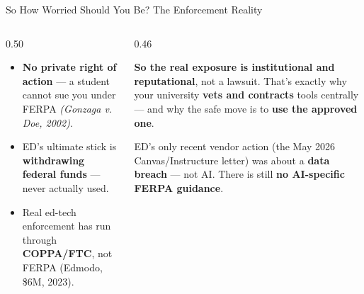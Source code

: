 \documentclass[aspectratio=169, 10pt]{beamer}
\newcommand{\cmcite}[1]{{\scriptsize\color{CoolGray}\textit{#1}}}
\begin{document}
\begin{frame}{So How Worried Should You Be? The Enforcement Reality}
\begin{columns}[T]
\begin{column}{0.50\textwidth}
\begin{tcolorbox}[keybox, title={\faBalanceScale\quad How FERPA is enforced}, top=3pt, bottom=3pt]
\small
\begin{itemize}\setlength{\itemsep}{2pt}
  \item \textbf{No private right of action} --- a student cannot sue you under FERPA \cmcite{(\textit{Gonzaga v. Doe}, 2002)}.
  \item ED's ultimate stick is \textbf{withdrawing federal funds} --- never actually used.
  \item Real ed-tech enforcement has run through \textbf{COPPA/FTC}, not FERPA (Edmodo, \$6M, 2023).
\end{itemize}
\end{tcolorbox}
\end{column}
\begin{column}{0.46\textwidth}
\begin{tcolorbox}[accentbox]
\small
\textbf{So the real exposure is \textbf{institutional and reputational}}, not a lawsuit.
\vskip3pt
That's exactly why your university \textbf{vets and contracts} tools centrally --- and why the safe move is to \textbf{use the approved one}.
\end{tcolorbox}
\vskip3pt
\begin{tcolorbox}[quotebox, top=2pt, bottom=2pt]
\scriptsize ED's only recent vendor action (the May 2026 Canvas/Instructure letter) was about a \textbf{data breach} --- not AI. There is still \textbf{no AI-specific FERPA guidance}.
\end{tcolorbox}
\end{column}
\end{columns}
\end{frame}
\end{document}
